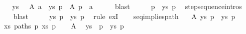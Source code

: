 \begin{isabellebody}
\ \ \isamarkupfalse%
\ \isamarkupfalse%
\ ys\ {\isasymalpha}\ \ A{}{\isacharcolon}{\kern0pt}\ {\isachardoublequoteopen}a\ {\isasymmapsto}{\isachardollar}{\kern0pt}\ ys\ p{\isacharprime}{\kern0pt}{\isacharprime}{\kern0pt}{\isachardoublequoteclose}\ \ A{}{\isacharcolon}{\kern0pt}\ {\isachardoublequoteopen}p\ {\isasymmapsto}{\isasymalpha}\ a{\isachardoublequoteclose}\isanewline
\ \ \ \ \isamarkupfalse%
\ blast\isanewline
\ \ \isamarkupfalse%
\ \isamarkupfalse%
\ {\isachardoublequoteopen}p\ {\isasymmapsto}{\isachardollar}{\kern0pt}\ {\isacharparenleft}{\kern0pt}{\isasymalpha}{\isacharhash}{\kern0pt}ys{\isacharparenright}{\kern0pt}\ p{\isacharprime}{\kern0pt}{\isacharprime}{\kern0pt}{\isachardoublequoteclose}\ \isamarkupfalse%
\ step{\isacharunderscore}{\kern0pt}sequence{\isachardot}{\kern0pt}intros{\isacharparenleft}{\kern0pt}{}{\isacharparenright}{\kern0pt}\isanewline
\ \ \ \ \isamarkupfalse%
\ blast\isanewline
\ \ \isamarkupfalse%
\ \isamarkupfalse%
\ {\isachardoublequoteopen}{\isasymexists}ys{\isachardot}{\kern0pt}\ p\ {\isasymmapsto}{\isachardollar}{\kern0pt}\ ys\ p{\isacharprime}{\kern0pt}{\isacharprime}{\kern0pt}{\isachardoublequoteclose}\ \isamarkupfalse%
\ {\isacharparenleft}{\kern0pt}rule\ exI{\isacharparenright}{\kern0pt}\isanewline
\ \ \isamarkupfalse%
\isanewline
{}\isamarkupfalse%
%
\endisatagproof
{\isafoldproof}%
%
\isadelimproof
\isanewline
%
\endisadelimproof
\isanewline
{}\isamarkupfalse%
\ seq{\isacharunderscore}{\kern0pt}implies{\isacharunderscore}{\kern0pt}path{\isacharcolon}{\kern0pt}\isanewline
\ \ \ A{}{\isacharcolon}{\kern0pt}\ {\isachardoublequoteopen}{\isasymexists}ys{\isachardot}{\kern0pt}\ p\ {\isasymmapsto}{\isachardollar}{\kern0pt}\ ys\ p{\isacharprime}{\kern0pt}{\isachardoublequoteclose}\isanewline
\ \ \ {\isachardoublequoteopen}{\isasymexists}xs{\isachardot}{\kern0pt}\ paths\ p\ xs\ p{\isacharprime}{\kern0pt}{\isachardoublequoteclose}\isanewline
%
\isadelimproof
%
\endisadelimproof
%
\isatagproof
{}\isamarkupfalse%
{\isacharminus}{\kern0pt}\isanewline
\ \ \isamarkupfalse%
\ A{}\ \isamarkupfalse%
\ ys\ \ {\isachardoublequoteopen}p\ {\isasymmapsto}{\isachardollar}{\kern0pt}\ ys\ p{\isacharprime}{\kern0pt}{\isachardoublequoteclose}\ \isamarkupfalse%

\end{isabellebody}
